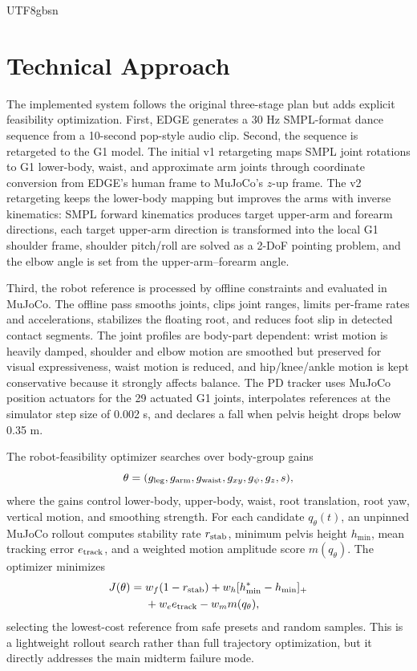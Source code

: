 \documentclass[conference]{IEEEtran}
\begin{document}
\begin{CJK*}{UTF8}{gbsn}
\section{Technical Approach}
The implemented system follows the original three-stage plan but adds explicit feasibility optimization. First, EDGE generates a 30 Hz SMPL-format dance sequence from a 10-second pop-style audio clip. Second, the sequence is retargeted to the G1 model. The initial v1 retargeting maps SMPL joint rotations to G1 lower-body, waist, and approximate arm joints through coordinate conversion from EDGE's human frame to MuJoCo's $z$-up frame. The v2 retargeting keeps the lower-body mapping but improves the arms with inverse kinematics: SMPL forward kinematics produces target upper-arm and forearm directions, each target upper-arm direction is transformed into the local G1 shoulder frame, shoulder pitch/roll are solved as a 2-DoF pointing problem, and the elbow angle is set from the upper-arm--forearm angle.

Third, the robot reference is processed by offline constraints and evaluated in MuJoCo. The offline pass smooths joints, clips joint ranges, limits per-frame rates and accelerations, stabilizes the floating root, and reduces foot slip in detected contact segments. The joint profiles are body-part dependent: wrist motion is heavily damped, shoulder and elbow motion are smoothed but preserved for visual expressiveness, waist motion is reduced, and hip/knee/ankle motion is kept conservative because it strongly affects balance. The PD tracker uses MuJoCo position actuators for the 29 actuated G1 joints, interpolates references at the simulator step size of 0.002 s, and declares a fall when pelvis height drops below 0.35 m.

The robot-feasibility optimizer searches over body-group gains
\begin{equation}
\theta=(g_{\rm leg},g_{\rm arm},g_{\rm waist},g_{xy},g_{\psi},g_z,s),
\end{equation}
where the gains control lower-body, upper-body, waist, root translation, root yaw, vertical motion, and smoothing strength. For each candidate $q_\theta(t)$, an unpinned MuJoCo rollout computes stability rate $r_{\rm stab}$, minimum pelvis height $h_{\min}$, mean tracking error $e_{\rm track}$, and a weighted motion amplitude score $m(q_\theta)$. The optimizer minimizes
\begin{align}
J(\theta)={}&w_f(1-r_{\rm stab})+w_h[h^*_{\min}-h_{\min}]_+ \nonumber\\
&+w_e e_{\rm track}-w_m m(q_\theta),
\end{align}
selecting the lowest-cost reference from safe presets and random samples. This is a lightweight rollout search rather than full trajectory optimization, but it directly addresses the main midterm failure mode.


\end{CJK*}
\end{document}
